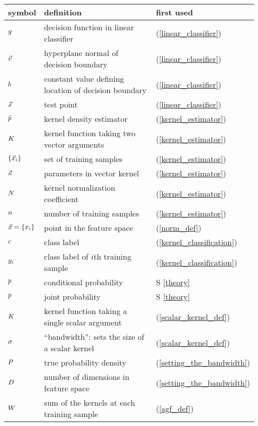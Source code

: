 
\begin{tabular}{lll}
symbol & definition & first used \\ \hline
	$g$ & decision function in linear classifier & (\ref{linear_classifier})\\
	$\vec v$ & hyperplane normal of decision boundary & (\ref{linear_classifier})\\
	$b$ & constant value defining location of decision boundary & (\ref{linear_classifier})\\
	$\vec {x}$ & test point & (\ref{linear_classifier})\\
	$\tilde p$ & kernel density estimator & (\ref{kernel_estimator})\\
	$K$ & kernel function taking two vector arguments & (\ref{kernel_estimator})\\
	$\lbrace \vec {x}_i \rbrace$ & set of training samples & (\ref{kernel_estimator})\\
	$\vec \kappa$ & parameters in vector kernel & (\ref{kernel_estimator})\\
	$N$ & kernel normalization coefficient & (\ref{kernel_estimator})\\
	$n$ & number of training samples & (\ref{kernel_estimator})\\
	$\vec {x}=\lbrace x_i \rbrace$ & point in the feature space & (\ref{norm_def})\\
	$c$ & class label & (\ref{kernel_classification})\\
	$y_i$ & class label of $i$th training sample & (\ref{kernel_classification})\\
	$p$ & conditional probability & S \ref{theory}\\
	$p$ & joint probability & S \ref{theory} \\
	$K$ & kernel function taking a single scalar argument & (\ref{scalar_kernel_def})\\
	$\sigma$ & ``bandwidth'': sets the size of a scalar kernel & (\ref{scalar_kernel_def})\\
	$P$ & true probability density & (\ref{setting_the_bandwidth})\\
	$D$ & number of dimensions in feature space & (\ref{setting_the_bandwidth})\\
	$W$ & sum of the kernels at each training sample & (\ref{agf_def})\\

\end{tabular}
